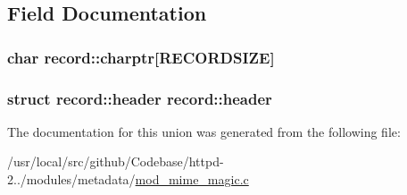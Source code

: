 \subsection{Field Documentation}
\subsubsection[{\texorpdfstring{charptr}{charptr}}]{\setlength{\rightskip}{0pt plus 5cm}char record\+::charptr\mbox{[}{\bf R\+E\+C\+O\+R\+D\+S\+I\+ZE}\mbox{]}}\hypertarget{unionrecord_a2e58755581f4fa53c972c57b7fa1d351}{}\label{unionrecord_a2e58755581f4fa53c972c57b7fa1d351}
\subsubsection[{\texorpdfstring{header}{header}}]{\setlength{\rightskip}{0pt plus 5cm}struct {\bf record\+::header}  {\bf record\+::header}}\hypertarget{unionrecord_a0d6ac40b4dbeec30d271c6c7d5edfd90}{}\label{unionrecord_a0d6ac40b4dbeec30d271c6c7d5edfd90}


The documentation for this union was generated from the following file\+:\begin{DoxyCompactItemize}
\item 
/usr/local/src/github/\+Codebase/httpd-\/2../modules/metadata/\hyperlink{mod__mime__magic_8c}{mod\+\_\+mime\+\_\+magic.\+c}\end{DoxyCompactItemize}
